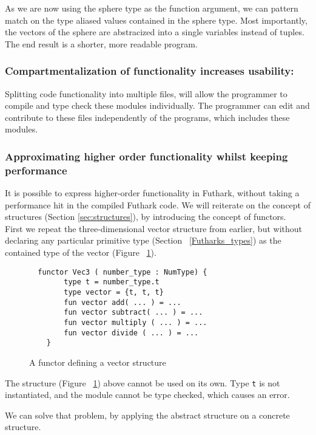 \noindent As we are now using the sphere type as the function argument, we can pattern
match on the type aliased values contained in the sphere type.
Most importantly, the vectors of the sphere are abstracized into a single variables
instead of tuples.
\\
The end result is a shorter, more readable program.

\subsubsection{Compartmentalization of functionality increases usability:}
Splitting code functionality into multiple files, will allow the programmer to
compile and type check these modules individually. The programmer can edit and
contribute to these files independently of the programs, which includes these
modules.

\subsubsection{Approximating higher order functionality whilst keeping performance}
\label{subsec:higherorderfunctionality}
It is possible to express higher-order functionality in Futhark, without taking
a performance hit in the compiled Futhark code.
We will reiterate on the concept of structures (Section \ref{sec:structures}), by introducing
the concept of functors.\\
First we repeat the three-dimensional vector structure
from earlier, but without declaring any particular
primitive type (Section ~\ref{Futharks_types}) as the contained type of the vector (Figure ~\ref{struct_vec3}).
\begin{figure}
  \begin{verbatim}
  functor Vec3 ( number_type : NumType) { 
        type t = number_type.t
        type vector = {t, t, t}
        fun vector add( ... ) = ...
        fun vector subtract( ... ) = ...
        fun vector multiply ( ... ) = ...
        fun vector divide ( ... ) = ...
    }
  \end{verbatim}
  \caption{A functor defining a vector structure \label{struct_vec3}}
\end{figure}

The structure (Figure ~\ref{struct_vec3}) above cannot be used on its own. Type \texttt{t} is not
instantiated, and the module cannot be type checked, which causes an error.


We can solve that problem, by applying the abstract structure on a concrete
structure.

